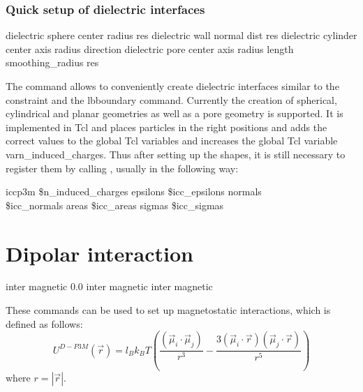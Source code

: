 \subsubsection{Quick setup of dielectric interfaces}

\begin{essyntax}
   dielectric sphere center    radius  res  
   dielectric wall normal    dist  res 
   dielectric cylinder  center    axis    radius  direction  
   dielectric pore center     axis    radius  length  smoothing\_radius  res 
\end{essyntax}

The command  allows to conveniently create
dielectric interfaces similar to the constraint and the lbboundary
command. Currently the creation of spherical, cylindrical and planar
geometries as well as a pore geometry is supported. It is implemented
in Tcl and places particles in the right positions and adds the
correct values to the global Tcl variables 
   and increases
the global Tcl variable var{n\_induced\_charges}. Thus after setting
up the shapes, it is still necessary to register them by calling
, usually in the following way:
\begin{code}
  iccp3m \$n\_induced\_charges epsilons \$icc\_epsilons normals \\ 
  \$icc\_normals areas \$icc\_areas sigmas \$icc\_sigmas
\end{code}

\section{Dipolar interaction}
\label{sec:inter-dipolar}

\begin{essyntax}
   inter magnetic 0.0
   inter magnetic
   inter magnetic 
\end{essyntax}

These commands can be used to set up magnetostatic interactions, which
is defined as follows:
\begin{equation}
  U^{D-P3M}(\vec{r}) = l_{B} k_B T \left( \frac{(\vec{\mu}_i \cdot \vec{\mu}_j)}{r^3} 
  - \frac{3  (\vec{\mu}_i \cdot \vec{r})  (\vec{\mu}_j \cdot \vec{r}) }{r^5} \right)
\end{equation}
where $r=|\vec{r}|$.

